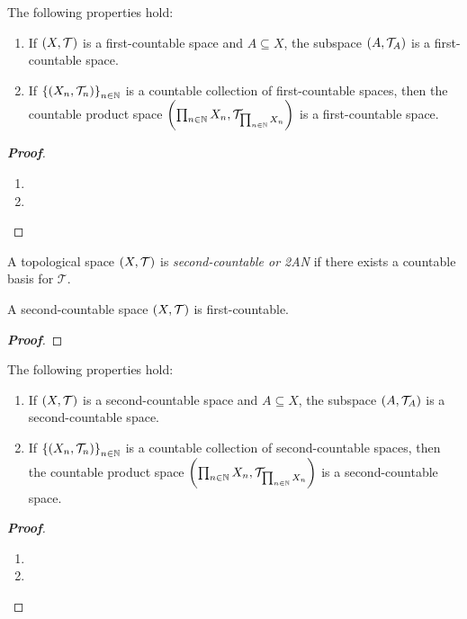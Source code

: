 \begin{proposition}
  The following properties hold:

  \begin{enumerate}
    \item If $\left(X,\mathcal{T}\right)$ is a first-countable space and $A\subseteq X$, the subspace $\left(A,\mathcal{T}_A\right)$ is a first-countable space.
    \item If $\left\{\left(X_n,\mathcal{T}_n\right)\right\}_{n\in\mathbb{N}}$ is a countable collection of first-countable spaces, then the countable product space $\left(\prod_{n\in\mathbb{N}}{X_n},\mathcal{T}_{\prod_{n\in\mathbb{N}}{X_n}}\right)$ is a first-countable space.
  \end{enumerate}
  
  \begin{proof}[\rm\textbf{Proof}]
    \hfill
    \begin{enumerate}
      \item 
      \item 
    \end{enumerate}
  \end{proof}
\end{proposition}

\begin{definition}
  A topological space $\left(X,\mathcal{T}\right)$ is \textit{second-countable or 2AN} if there exists a countable basis for $\mathcal{T}$.
\end{definition}

\begin{proposition}
  A second-countable space $\left(X,\mathcal{T}\right)$ is first-countable.
  
  \begin{proof}[\rm\textbf{Proof}]
    
  \end{proof}
\end{proposition}

\begin{proposition}
  The following properties hold:

  \begin{enumerate}
    \item If $\left(X,\mathcal{T}\right)$ is a second-countable space and $A\subseteq X$, the subspace $\left(A,\mathcal{T}_A\right)$ is a second-countable space.
    \item If $\left\{\left(X_n,\mathcal{T}_n\right)\right\}_{n\in\mathbb{N}}$ is a countable collection of second-countable spaces, then the countable product space $\left(\prod_{n\in\mathbb{N}}{X_n},\mathcal{T}_{\prod_{n\in\mathbb{N}}{X_n}}\right)$ is a second-countable space.
  \end{enumerate}
  
  \begin{proof}[\rm\textbf{Proof}]
    \hfill
    \begin{enumerate}
      \item 
      \item 
    \end{enumerate}
  \end{proof}
\end{proposition}

